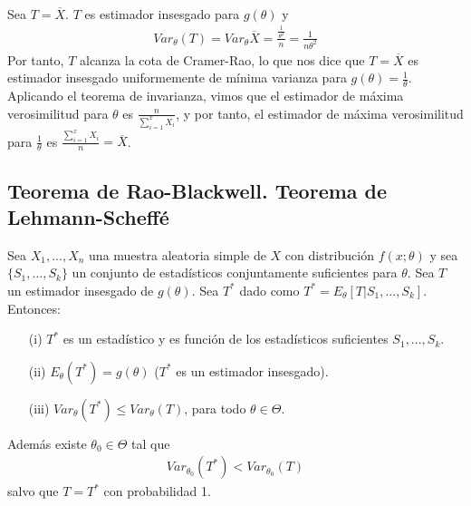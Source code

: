 \begin{ejemplo}
\\
\newline
Sea $T = \overline{X}$. $T$ es estimador insesgado para $g(\theta)$ y
\begin{align*}
    Var_{\theta}(T) = Var_{\theta}{\overline{X}} = \frac{\frac{1}{\theta^2}}{n} = \frac{1}{n \theta^2}
\end{align*}
Por tanto, $T$ alcanza la cota de Cramer-Rao, lo que nos dice que $T = \overline{X}$ es estimador insesgado uniformemente de mínima varianza para $g(\theta) = \frac{1}{\theta}$.
\\
\newline
Aplicando el teorema de invarianza, vimos que el estimador de máxima verosimilitud para $\theta$ es $\frac{n}{\sum_{i=1}^{x}{X_i}}$, y por tanto, el estimador de máxima verosimilitud para $\frac{1}{\theta}$ es $\frac{\sum_{i=1}^{x}{X_i}}{n} = \overline{X}$.
\end{ejemplo}

\subsection{Teorema de Rao-Blackwell. Teorema de Lehmann-Scheffé}

\begin{teo}
Sea $X_1,...,X_n$ una muestra aleatoria simple de $X$ con distribución $f(x;\theta)$ y sea $\{S_1,...,S_k\}$ un conjunto de estadísticos conjuntamente suficientes para $\theta$. Sea $T$ un estimador insesgado de $g(\theta)$. Sea $T^*$ dado como $T^* = E_{\theta}[T | S_1,...,S_k]$. Entonces:
\begin{enumerate}
    \item[(i)] $T^*$ es un estadístico y es función de los estadísticos suficientes $S_1,...,S_k$.
    \item[(ii)] $E_{\theta}(T^*) = g(\theta)$ ($T^*$ es un estimador insesgado).
    \item[(iii)] $Var_{\theta}(T^*) \leq Var_{\theta}(T)$, para todo $\theta \in \Theta$.
\end{enumerate}
Además existe $\theta_0 \in \Theta$ tal que
\begin{align*}
    Var_{\theta_0}(T^*) < Var_{\theta_0}(T)
\end{align*}
salvo que $T = T^*$ con probabilidad 1.
\end{teo}

